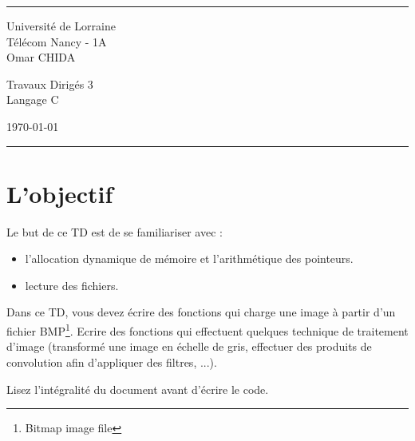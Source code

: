 \documentclass[a4paper]{article}
\begin{document}
	
	\fancyhead[C]{}
	\hrule \medskip %
	\begin{minipage}{0.295\textwidth} 
		\raggedright
		\footnotesize
		Université de Lorraine\hfill\\   
		Télécom Nancy - 1A\hfill\\
		Omar CHIDA
	\end{minipage}
	\begin{minipage}{0.4\textwidth} 
		\centering 
		\large 
		Travaux Dirigés 3\\ 
		\normalsize 
		Langage C\\ 
	\end{minipage}
	\begin{minipage}{0.295\textwidth} 
		\raggedleft
		\today\hfill\\
	\end{minipage}
	\medskip\hrule 
	\bigskip
	
	\section*{L'objectif}
	Le but de ce TD est de se familiariser avec :
	\begin{itemize}
		\item l'allocation dynamique de mémoire et l'arithmétique des pointeurs.
		\item lecture des fichiers.
	\end{itemize}

	Dans ce TD, vous devez écrire des fonctions qui charge une image à partir d'un fichier BMP\footnote{Bitmap image file}. Ecrire des fonctions qui effectuent quelques technique de traitement d'image (transformé une image en échelle de gris, effectuer des produits de convolution afin d'appliquer des filtres, ...). \\
	
	\centerline{\Large{Lisez l'intégralité du document avant d'écrire le code.}}
	
\end{document}
